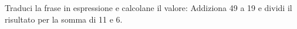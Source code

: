 \item Traduci la frase in espressione e calcolane il valore: Addiziona 49 a 19 e dividi il risultato per la somma di 11 e 6.